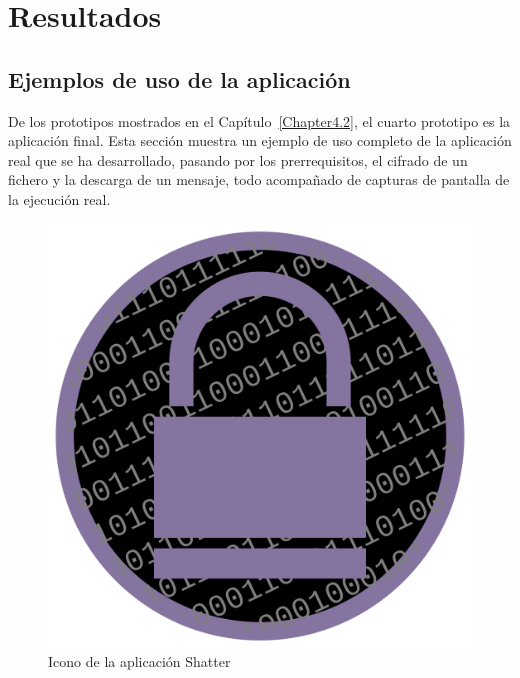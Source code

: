 
\chapter{Resultados} %

\label{Chapter5} %


\section{Ejemplos de uso de la aplicación}

De los prototipos mostrados en el Capítulo~\ref{Chapter4.2}, el cuarto prototipo es la aplicación final. Esta sección muestra un ejemplo de uso completo de la aplicación real que se ha desarrollado, pasando por los prerrequisitos, el cifrado de un fichero y la descarga de un mensaje, todo acompañado de capturas de pantalla de la ejecución real.

\begin{figure}[!htb]
  \centering
  \includegraphics[scale=0.2]{Figures/launcher}
  \decoRule
  \caption[Shatter (Icono)]{Icono de la aplicación Shatter}
  \label{fig:launcher}
\end{figure}

